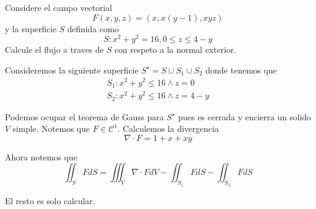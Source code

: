 \documentclass[../main.tex]{subfiles}
\begin{document}
\begin{problem}
  Considere el campo vectorial
  \begin{equation*}
    F(x, y, z) = (x, x(y - 1), xyz)
  \end{equation*}
  y la superficie $S$ definida como
  \begin{equation*}
    S: x^{2} + y^{2}  = 16, 0 \leq z \leq 4 - y
  \end{equation*}
  Calcule el flujo a traves de $S$ con respeto a la normal exterior.
\end{problem}
\begin{solution}
  Consideremos la siguiente superficie $S^{\star} = S \cup S_{1} \cup S_{2}$ donde tenemos que
  \begin{gather*}
    S_{1}: x^{2} + y^{2} \leq 16 \land z = 0\\
    S_{2}: x^{2} + y^{2} \leq 16 \land z = 4 - y
  \end{gather*}

  Podemos ocupar el teorema de Gauss para $S^{\star}$ pues es cerrada y encierra un solido $V$ simple. Notemos que $F \in \mathcal{C}^{1}$. Calculemos la divergencia
  \begin{equation*}
    \nabla \cdot F = 1 + x + xy
  \end{equation*}

  Ahora notemos que
  \begin{equation*}
    \iint_{S} F dS = \iiint_{V} \nabla \cdot F dV - \iint_{S_{1}} F dS - \iint_{S_{2}} F dS
  \end{equation*}

  El resto es solo calcular.
\end{solution}
\end{document}

